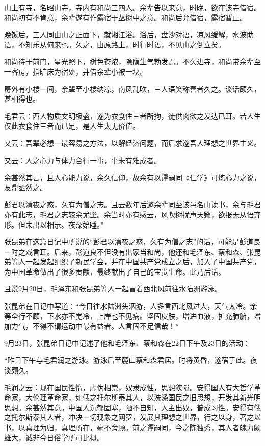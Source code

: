 \documentclass[../../dazhuan.tex]{subfiles}
\begin{document}
山上有寺，名昭山寺，寺内有和尚三四人。余辈告以来意，时晚，欲在该寺借宿。和尚初有不肯意，余辈遂有作露宿于丛树中之意。和尚后允借宿，露宿暂止。

晚饭后，三人同由山之正面下，就湘江浴。浴后，盘沙对语，凉风缓解，水波助语，不知乐从何来也。久之，由原路上，时行时语，不见山之倒立矣。

和尚待于前门，星光照下，树色苍浓，隐隐生气勃发焉。不久进寺，和尚带余辈至一客房，指旷床为宿处，并借余辈小被一块。

房外有小楼一间，余辈至小楼纳凉，南风乱吹，三人语笑称善者久之。谈话颇久，甚相得也。

毛君云：西人物质文明极盛，遂为衣食住三者所拘，徒供肉欲之发达已耳。若人生仅此衣食住三者而已足，是人生太无价值。

又云：吾辈必想一最容易之方法，以解经济问题，而后求遂吾人理想之世界主义。

又云：人之心力与体力合行一事，事未有难成者。

余甚然其言，且人心能力说，余久信仰，故余有以谭嗣同《仁学》可炼心力之说，友鼎丞然之。

彭君以清夜之惑，久有为僧之志。且云数年后邀余辈同至该邑名山读书，余与毛君亦有此志，毛君之志较余尤坚。余当时亦有感云，风吹树扰声天籁，欲报无从悟弃形。但未出以相示。夜深始睡。”

张昆弟在这篇日记中所说的“彭君以清夜之惑，久有为僧之志”的话，可能是彭道良一时之戏言耳。后来，彭道良不但没有出家当和尚，他还和毛泽东、蔡和森、张昆弟等人一起发起组织了新民学会，并在中国共产党成立之后，加入了中国共产党，为中国革命做出了很多贡献，最终献出了自己的宝贵生命。此乃后话。

且说9月20日，毛泽东和张昆弟等人一起冒着西北风前往水陆洲游泳。

张昆弟在日记中写道：“今日往水陆洲头泅游，人多言西北风过大，天气太冷。余等全行不顾，下水亦不觉冷，上岸也不见病。坚固皮肤，增进血液，扩充肺腑，增加力气，不得不谓运动中最有益者。人言固不足信哉！”

9月23日，张昆弟日记中记述了他和毛泽东、蔡和森在22日下午及23日的活动：

“昨日下午与毛君润之游泳。游泳后至麓山蔡和森君居。时将黄昏，遂宿于此。夜谈颇久。

毛润之云：现在国民性惰，虚伪相崇，奴隶成性，思想狭隘。安得国人有大哲学革命家，大伦理革命家，如俄之托尔斯泰其人，以洗涤国民之旧思想，开发其新光明思想。余甚然其意。中国人沉郁固塞，陋不自知，入主出奴，普成习性。安得有俄之托尔斯泰其人者，冲决一切现象之网罗，发展其理想之世界，行之以身，著之以书，以真理为归，真理所在，毫不旁顾。前之谭嗣同，今之陈独秀，其人者魄力颇雄大，诚非今日俗学所可比拟。
\end{document}
